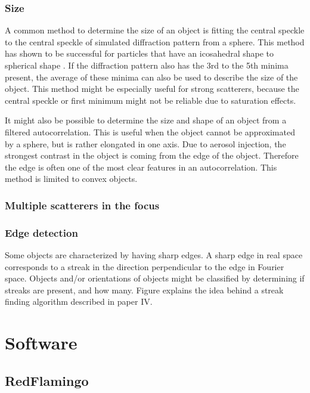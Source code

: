 \subsection{Size}
A common method to determine the size of an object is fitting the central speckle to the central speckle of simulated diffraction pattern from a sphere. This method has shown to be successful for particles that have an icosahedral shape to spherical shape \cite{Hantke2014,Daurer2017}. If the diffraction pattern also has the 3rd to the 5th minima present, the average of these minima can also be used to describe the size of the object. This method might be especially useful for strong scatterers, because the central speckle or first minimum might not be reliable due to saturation effects.

It might also be possible to determine the size and shape of an object from a filtered autocorrelation. This is useful when the object cannot be approximated by a sphere, but is rather elongated in one axis. Due to aerosol injection, the strongest contrast in the object is coming from the edge of the object. Therefore the edge is often one of the most clear features in an autocorrelation. This method is limited to convex objects.

\subsection{Multiple scatterers in the focus}


\subsection{Edge detection}
Some objects are characterized by having sharp edges. A sharp edge in real space corresponds to a streak in the direction perpendicular to the edge in Fourier space. Objects and/or orientations of objects might be classified by determining if streaks are present, and how many. Figure explains the idea behind a streak finding algorithm described in paper IV.


\chapter{Software}
\section{RedFlamingo}
